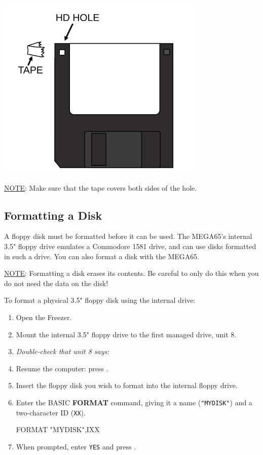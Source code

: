 \begin{center}
  \includegraphics[width=0.75\textwidth]{images/illustrations/floppy_hd.pdf}
\end{center}

\underline{NOTE}: Make sure that the tape covers both sides of the hole.

\subsection{Formatting a Disk}

A floppy disk must be formatted before it can be used. The MEGA65's internal 3.5" floppy drive emulates a Commodore 1581 drive, and can use disks formatted in such a drive. You can also format a disk with the MEGA65.

\underline{NOTE}: Formatting a disk erases its contents. Be careful to only do this when you do not need the data on the disk!

To format a physical 3.5" floppy disk using the internal drive:

\begin{enumerate}
\item Open the Freezer.
\item Mount the internal 3.5" floppy drive to the first managed drive, unit 8.
\item {\it Double-check that unit 8 says:} 
\item Resume the computer: press .
\item Insert the floppy disk you wish to format into the internal floppy drive.
\item Enter the BASIC {\bf FORMAT} command, giving it a name ({\tt "MYDISK"}) and a two-character ID ({\tt XX}).
\begin{screencode}
FORMAT "MYDISK",IXX
\end{screencode}
\item When prompted, enter {\tt YES} and press .
\end{enumerate}

